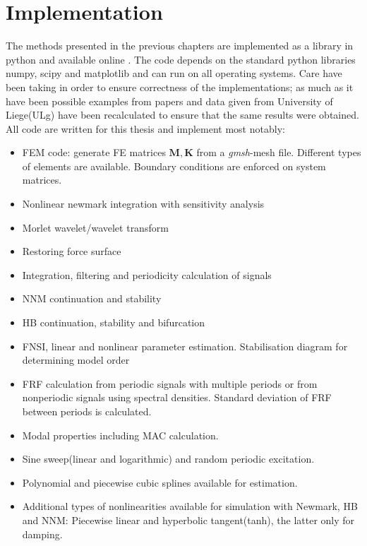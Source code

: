 
\chapter{Implementation}
\label{cha:implementation}


The methods presented in the previous chapters are implemented as a library in
python and available online \autocite{paw2017}. The code depends on the standard
python libraries numpy, scipy and matplotlib and can run on all operating
systems. Care have been taking in order to ensure correctness of the
implementations; as much as it have been possible examples from papers and data
given from University of Liege(ULg) have been recalculated to ensure that the same
results were obtained. All code are written for this thesis and implement most
notably:
\begin{itemize}
\item FEM code: generate FE matrices $\bm M, \bm K$ from a \textit{gmsh}-mesh
  file. Different types of elements are available. Boundary conditions are
  enforced on system matrices.
\item Nonlinear newmark integration with sensitivity analysis
\item Morlet wavelet/wavelet transform
\item Restoring force surface
\item Integration, filtering and periodicity calculation of signals
\item NNM continuation and stability
\item HB continuation, stability and bifurcation
\item FNSI, linear and nonlinear parameter estimation. Stabilisation diagram
  for determining model order
\item FRF calculation from periodic signals with multiple periods or from
  nonperiodic signals using spectral densities. Standard deviation of FRF
  between periods is calculated.
\item Modal properties including MAC calculation.
\item Sine sweep(linear and logarithmic) and random periodic excitation.
\item Polynomial and piecewise cubic splines available for estimation.
\item Additional types of nonlinearities available for simulation with Newmark,
  HB and NNM: Piecewise linear and hyperbolic tangent(tanh), the latter only for
  damping.
\end{itemize}


